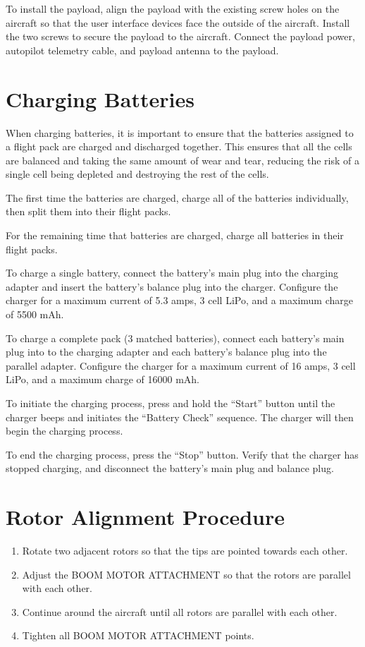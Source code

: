 \documentclass{report}
\begin{document}
		To install the payload, align the payload with the existing screw holes on the aircraft so that the user interface devices face the outside of the aircraft.  Install the two screws to secure the payload to the aircraft.  Connect the payload power, autopilot telemetry cable, and payload antenna to the payload.
	\section{Charging Batteries}
		When charging batteries, it is important to ensure that the batteries assigned to a flight pack are charged and discharged together.  This ensures that all the cells are balanced and taking the same amount of wear and tear, reducing the risk of a single cell being depleted and destroying the rest of the cells.

		The first time the batteries are charged, charge all of the batteries individually, then split them into their flight packs.

		For the remaining time that batteries are charged, charge all batteries in their flight packs.

		To charge a single battery, connect the battery's main plug into the charging adapter and insert the battery's balance plug into the charger.  Configure the charger for a maximum current of 5.3 amps, 3 cell LiPo, and a maximum charge of 5500 mAh.

		To charge a complete pack (3 matched batteries), connect each battery's main plug into to the charging adapter and each battery's balance plug into the parallel adapter.  Configure the charger for a maximum current of 16 amps, 3 cell LiPo, and a maximum charge of 16000 mAh.

		To initiate the charging process, press and hold the ``Start'' button until the charger beeps and initiates the ``Battery Check'' sequence.  The charger will then begin the charging process.

		To end the charging process, press the ``Stop'' button.  Verify that the charger has stopped charging, and disconnect the battery's main plug and balance plug.
	\section{Rotor Alignment Procedure}
		\begin{enumerate}
			\item Rotate two adjacent rotors so that the tips are pointed towards each other.
			\item Adjust the BOOM MOTOR ATTACHMENT so that the rotors are parallel with each other.
			\item Continue around the aircraft until all rotors are parallel with each other.
			\item Tighten all BOOM MOTOR ATTACHMENT points.
		\end{enumerate}
\end{document}

